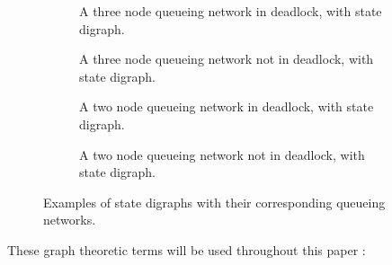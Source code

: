\documentclass{article}
\numberwithin{equation}{section}
\begin{document}
\begin{figure}[!htbp]
\begin{center}
  \begin{subfigure}{0.45\textwidth}
    \begin{center}
      
    \end{center}
    \caption{A three node queueing network in deadlock, with state digraph.}
    \label{fig:exampledigraph_deadlock}
  \end{subfigure}
  \hspace{6 mm}
  \begin{subfigure}{0.45\textwidth}
    \begin{center}
      
    \end{center}
    \caption{A three node queueing network not in deadlock, with state
    digraph.}
    \label{fig:exampledigraph_nodeadlock}
    \vspace{6 mm}
  \end{subfigure}
  \begin{subfigure}{0.45\textwidth}
    \begin{center}
      
    \end{center}
    \caption{A two node queueing network in deadlock, with state digraph.}
    \label{fig:exampledigraph2_nodeadlock}
  \end{subfigure}
  \hspace{6 mm}
  \begin{subfigure}{0.45\textwidth}
    \begin{center}
      
    \end{center}
    \caption{A two node queueing network not in deadlock, with state digraph.}
    \label{fig:exampledigraph2_nodeadlock}
    \vspace{6 mm}
  \end{subfigure}
  \end{center}
  \caption{Examples of state digraphs with their corresponding queueing
  networks.}
  \label{fig:exampledigraphs}
\end{figure}

These graph theoretic terms will be used throughout this paper
\cite{gibbons85, wilson70}:
\end{document}
